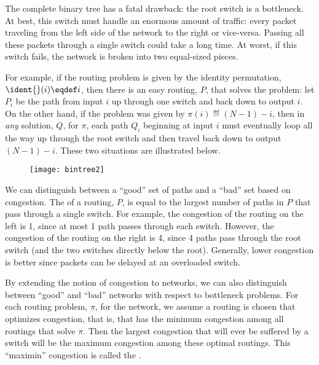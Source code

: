 The complete binary tree has a fatal drawback: the root switch is a
bottleneck.  At best, this switch must handle an enormous amount of
traffic: every packet traveling from the left side of the network to the
right or vice-versa.  Passing all these packets through a single switch
could take a long time.  At worst, if this switch fails, the network is
broken into two equal-sized pieces.

For example, if the routing problem is given by the identity permutation,
$\ident{}(i) \eqdef i$, then there is an easy routing, $P$, that solves
the problem: let $P_i$ be the path from input $i$ up through one switch
and back down to output $i$.  On the other hand, if the problem was given
by $\pi(i) \eqdef (N - 1) - i$, then in \emph{any} solution, $Q$, for
$\pi$, each path $Q_i$ beginning at input $i$ must eventually loop all
the way up through the root switch and then travel back down to output $(N
- 1) - i$.  These two situations are illustrated below.
\begin{figure}
\texttt{[image: bintree2]}
\end{figure}
We can distinguish between a ``good'' set of paths and a ``bad'' set based
on congestion.  The  of a routing, $P$, is equal to the
largest number of paths in $P$ that pass through a single switch.  For
example, the congestion of the routing on the left is 1, since at most 1
path passes through each switch.  However, the congestion of the routing
on the right is 4, since 4 paths pass through the root switch (and the two
switches directly below the root).  Generally, lower congestion is better
since packets can be delayed at an overloaded switch.

By extending the notion of congestion to networks, we can also distinguish
between ``good'' and ``bad'' networks with respect to bottleneck problems.
For each routing problem, $\pi$, for the network, we assume a routing is
chosen that optimizes congestion, that is, that has the minimum congestion
among all routings that solve $\pi$.  Then the largest congestion that
will ever be suffered by a switch will be the maximum congestion among
these optimal routings.  This ``maximin'' congestion is called the
.

